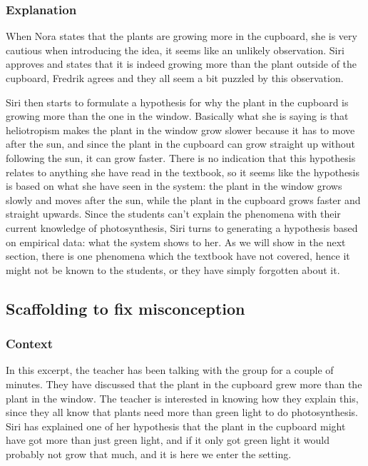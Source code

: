 \subsubsection*{Explanation}
When Nora states that the plants are growing more in the cupboard, she is very cautious when introducing the idea, it seems like an unlikely observation. Siri approves and states that it is indeed growing more than the plant outside of the cupboard, Fredrik agrees and they all seem a bit puzzled by this observation.

Siri then starts to formulate a hypothesis for why the plant in the cupboard is growing more than the one in the window. Basically what she is saying is that heliotropism makes the plant in the window grow slower because it has to move after the sun, and since the plant in the cupboard can grow straight up without following the sun, it can grow faster. There is no indication that this hypothesis relates to anything she have read in the textbook, so it seems like the hypothesis is based on what she have seen in the system: the plant in the window grows slowly and moves after the sun, while the plant in the cupboard grows faster and straight upwards. Since the students can't explain the phenomena with their current knowledge of photosynthesis, Siri turns to generating a hypothesis based on empirical data: what the system shows to her. As we will show in the next section, there is one phenomena which the textbook have not covered, hence it might not be known to the students, or they have simply forgotten about it.


\subsection{Scaffolding to fix misconception}

\subsubsection*{Context}
In this excerpt, the teacher has been talking with the group for a couple of minutes. They have discussed that the plant in the cupboard grew more than the plant in the window. The teacher is interested in knowing how they explain this, since they all know that plants need more than green light to do photosynthesis. Siri has explained one of her hypothesis that the plant in the cupboard might have got more than just green light, and if it only got green light it would probably not grow that much, and it is here we enter the setting.
 
